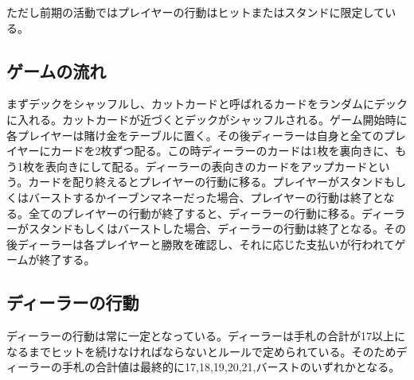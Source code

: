 ただし前期の活動ではプレイヤーの行動はヒットまたはスタンドに限定している。

\subsection{ゲームの流れ}
まずデックをシャッフルし、カットカードと呼ばれるカードをランダムにデックに入れる。カットカードが近づくとデックがシャッフルされる。ゲーム開始時に各プレイヤーは賭け金をテーブルに置く。その後ディーラーは自身と全てのプレイヤーにカードを2枚ずつ配る。この時ディーラーのカードは1枚を裏向きに、もう1枚を表向きにして配る。ディーラーの表向きのカードをアップカードという。カードを配り終えるとプレイヤーの行動に移る。プレイヤーがスタンドもしくはバーストするかイーブンマネーだった場合、プレイヤーの行動は終了となる。全てのプレイヤーの行動が終了すると、ディーラーの行動に移る。ディーラーがスタンドもしくはバーストした場合、ディーラーの行動は終了となる。その後ディーラーは各プレイヤーと勝敗を確認し、それに応じた支払いが行われてゲームが終了する。

\subsection{ディーラーの行動}
ディーラーの行動は常に一定となっている。ディーラーは手札の合計が17以上になるまでヒットを続けなければならないとルールで定められている。そのためディーラーの手札の合計値は最終的に17,18,19,20,21,バーストのいずれかとなる。


